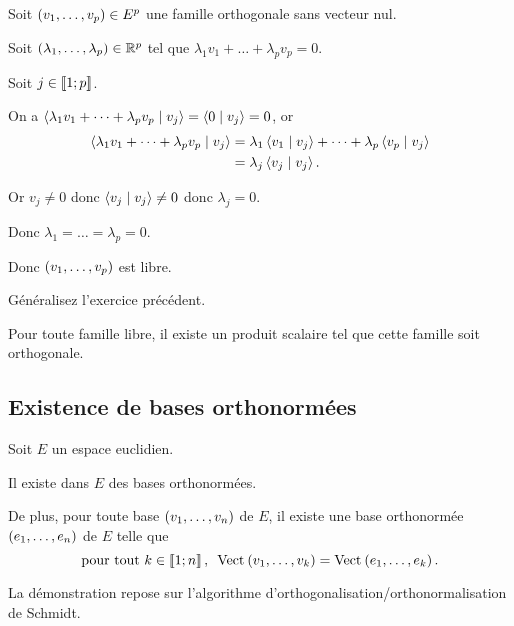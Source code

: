 \begin{dem}
Soit \(\left(v_1,\dots,v_p\right)\in E^p\) une famille orthogonale sans vecteur nul.

Soit \(\left(\lambda_1,\dots,\lambda_p\right)\in\mathbb{R}^p\) tel que \(\lambda_1v_1+\dots+\lambda_pv_p=0\).

Soit \(j\in\left\llbracket1;p\right\rrbracket\).

On a \(\ps{\lambda_1v_1+\dots+\lambda_pv_p}{v_j}=\ps{0}{v_j}=0\), or \[\begin{aligned}
\ps{\lambda_1v_1+\dots+\lambda_pv_p}{v_j}&=\lambda_1\ps{v_1}{v_j}+\dots+\lambda_p\ps{v_p}{v_j} \\
&=\lambda_j\ps{v_j}{v_j}.
\end{aligned}\]

Or \(v_j\not=0\) donc \(\ps{v_j}{v_j}\not=0\) donc \(\lambda_j=0\).

Donc \(\lambda_1=\dots=\lambda_p=0\).

Donc \(\left(v_1,\dots,v_p\right)\) est libre.
\end{dem}

\begin{exo}
Généralisez l'exercice précédent.
\end{exo}

\begin{corr}
Pour toute famille libre, il existe un produit scalaire tel que cette famille soit orthogonale.
\end{corr}

\subsection{Existence de bases orthonormées}

\begin{theo}
Soit \(E\) un espace euclidien.

Il existe dans \(E\) des bases orthonormées.

De plus, pour toute base \(\left(v_1,\dots,v_n\right)\) de \(E\), il existe une base orthonormée \(\left(e_1,\dots,e_n\right)\) de \(E\) telle que \[\quantifs{\tpt k\in\interventierii{1}{n}}\Vect{v_1,\dots,v_k}=\Vect{e_1,\dots,e_k}.\]
\end{theo}

La démonstration repose sur l'algorithme d'orthogonalisation/orthonormalisation de Schmidt.


